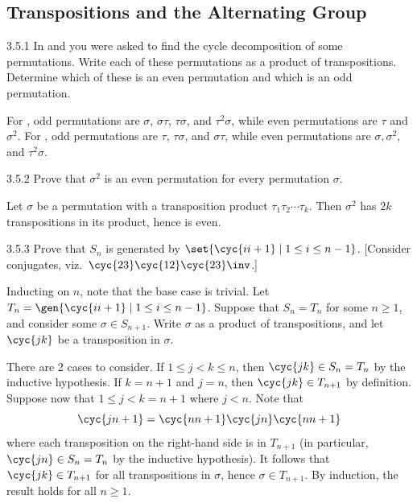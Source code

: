 \subsection{Transpositions and the Alternating Group}

\begin{exercise}{3.5.1}
    In  and  you were asked to find the cycle decomposition of some permutations.
	Write each of these permutations as a product of transpositions.
	Determine which of these is an even permutation and which is an odd permutation.
\end{exercise}

\begin{sol}
    For , odd permutations are $\sigma$, $\sigma\tau$, $\tau\sigma$, and $\tau^2\sigma$, while even permutations are $\tau$ and $\sigma^2$.
	For , odd permutations are $\tau$, $\tau\sigma$, and $\sigma\tau$, while even permutations are $\sigma, \sigma^2$, and $\tau^2\sigma$.
\end{sol}

\begin{exercise}{3.5.2}
    Prove that $\sigma^2$ is an even permutation for every permutation $\sigma$.
\end{exercise}

\begin{sol}
    Let $\sigma$ be a permutation with a transposition product $\tau_1\tau_2 \cdots \tau_k$.
	Then $\sigma^2$ has $2k$ transpositions in its product, hence is even.
\end{sol}

\begin{exercise}{3.5.3}
    Prove that $S_n$ is generated by $\set{\cyc{i i+1}\mid 1 \leq i \leq n-1}$. [Consider conjugates, viz.\ $\cyc{2 3}\cyc{1 2}\cyc{2 3}\inv$.]
\end{exercise}

\begin{sol}
    Inducting on $n$, note that the base case is trivial.
	Let $T_n = \gen{\cyc{i i + 1} \mid 1 \leq i \leq n - 1}$.
	Suppose that $S_n = T_n$ for some $n \geq 1$, and consider some $\sigma \in S_{n + 1}$.
	Write $\sigma$ as a product of transpositions, and let $\cyc{j k}$ be a transposition in $\sigma$.

    There are 2 cases to consider.
	If $1 \leq j < k \leq n$, then $\cyc{j k} \in S_n = T_n$ by the inductive hypothesis.
	If $k = n + 1$ and $j = n$, then $\cyc{j k} \in T_{n + 1}$ by definition.
	Suppose now that $1 \leq j < k = n + 1$ where $j < n$.
	Note that
    \[
    	\cyc{j n + 1} = \cyc{n n + 1}\cyc{j n}\cyc{n n + 1}
    \]
    where each transposition on the right-hand side is in $T_{n + 1}$ (in particular, $\cyc{j n} \in S_n = T_n$ by the inductive hypothesis).
	It follows that $\cyc{j k} \in T_{n + 1}$ for all transpositions in $\sigma$, hence $\sigma \in T_{n + 1}$.
	By induction, the result holds for all $n \geq 1$.
\end{sol}

